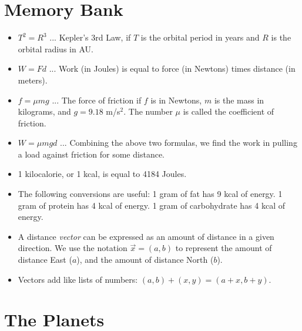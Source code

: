 \documentclass[10pt]{article}
\begin{document}
\maketitle

\section{Memory Bank}

\begin{itemize}
\item $T^2 = R^3$ ... Kepler's 3rd Law, if $T$ is the orbital period in years and $R$ is the orbital radius in AU.
\item $W = F d$ ... Work (in Joules) is equal to force (in Newtons) times distance (in meters).
\item $f = \mu m g$ ... The force of friction if $f$ is in Newtons, $m$ is the mass in kilograms, and $g = 9.18$ m/s$^2$.  The number $\mu$ is called the coefficient of friction.
\item $W = \mu m g d$ ... Combining the above two formulas, we find the work in pulling a load against friction for some distance.
\item 1 kilocalorie, or 1 kcal, is equal to 4184 Joules.
\item The following conversions are useful: 1 gram of fat has 9 kcal of energy.  1 gram of protein has 4 kcal of energy.  1 gram of carbohydrate has 4 kcal of energy.
\item A distance \textit{vector} can be expressed as an amount of distance in a given direction.  We use the notation $\vec{x} = (a,b)$ to represent the amount of distance East ($a$), and the amount of distance North ($b$).
\item Vectors add like lists of numbers: $(a,b) + (x,y) = (a+x,b+y)$.
\end{itemize}

\section{The Planets}
\end{document}
